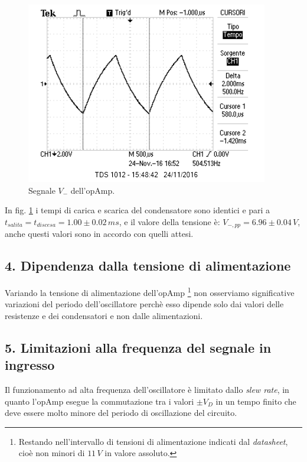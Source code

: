 \documentclass[10pt,a4paper]{article}
\begin{document}
\begin{figure}[htb!]
\centering
\includegraphics[scale=1.0]{immagini/multivibratoreVMENO.png}
\caption{Segnale $V_{-}$ dell'opAmp.}
\label{Vmeno}
\end{figure}

In fig. \ref{Vmeno} i tempi di carica e scarica del condensatore sono identici e pari a $t_{salita} = t_{discesa} = 1.00 \pm 0.02\, ms$, e il valore della tensione è: $V_{-, pp} = 6.96 \pm 0.04 \, V$, anche questi valori sono in accordo con quelli attesi.


\subsection*{4. Dipendenza dalla tensione di alimentazione}
Variando la tensione di alimentazione dell'opAmp \footnote{Restando nell'intervallo di tensioni di alimentazione indicati dal \emph{datasheet}, cioè non minori di $11\,V$ in valore assoluto.} non osserviamo significative variazioni del periodo dell'oscillatore perchè esso dipende solo dai valori delle resistenze e dei condensatori e non dalle alimentazioni. 


\subsection*{5. Limitazioni alla frequenza del segnale in ingresso}
Il funzionamento ad alta frequenza dell'oscillatore è limitato dallo \emph{slew rate}, in quanto l'opAmp esegue la commutazione tra i valori $\pm V_{D}$ in un tempo finito che deve essere molto minore del periodo di oscillazione del circuito.
\end{document}
